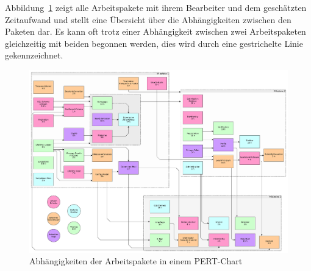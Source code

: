 
Abbildung~\ref{fig:pert} zeigt alle Arbeitspakete mit ihrem Bearbeiter und dem geschätzten Zeitaufwand
und stellt eine Übersicht über die Abhängigkeiten zwischen den Paketen dar.
Es kann oft trotz einer Abhängigkeit zwischen zwei Arbeitspaketen gleichzeitig mit beiden begonnen werden,
dies wird durch eine gestrichelte Linie gekennzeichnet.

\begin{figure}
    \includegraphics[width=\textwidth]{graphics/pert}
    \caption{Abhängigkeiten der Arbeitspakete in einem PERT-Chart}
    \label{fig:pert}
\end{figure}
